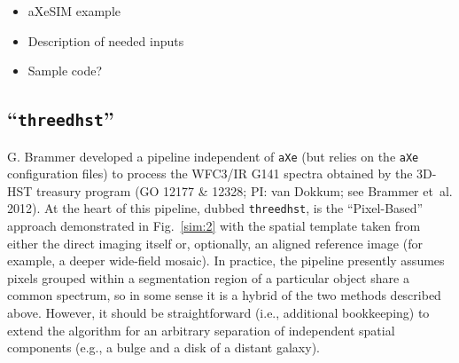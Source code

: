 \documentclass[preprint]{aastex}
\begin{document}
\begin{itemize}
\item aXeSIM example
\item Description of needed inputs
\item Sample code?
\end{itemize}

\subsection{``\texttt{threedhst}''}

G. Brammer developed a pipeline independent of \texttt{aXe} (but relies on the \texttt{aXe} configuration files)  to process the WFC3/IR G141 spectra obtained by the 3D-HST treasury program (GO 12177 \& 12328; PI: van Dokkum; see Brammer et~al. 2012).  At the heart of this pipeline, dubbed \texttt{threedhst}, is the ``Pixel-Based'' approach demonstrated in Fig.~\ref{sim:2} with the spatial template taken from either the direct imaging itself or, optionally, an aligned reference image (for example, a deeper wide-field mosaic).  In practice, the pipeline presently assumes pixels grouped within a segmentation region of a particular object share a common spectrum, so in some sense it is a hybrid of the two methods described above.  However, it should be straightforward (i.e., additional bookkeeping) to extend the algorithm for an arbitrary separation of independent spatial components (e.g., a bulge and a disk of a distant galaxy).

\end{document}
